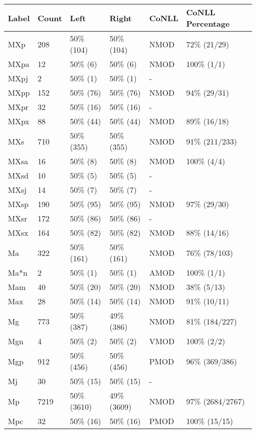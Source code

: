 \begin{figure*}
\begin{tabular}{|l|l|l|l||l|l|}
\hline
Label & Count & Left & Right & CoNLL & CoNLL Percentage\\ 
\hline
 MXp & 208 & 50\% (104) & 50\% (104) & NMOD & 72\% (21/29) \\ 
\hline
 MXpa & 12 & 50\% (6) & 50\% (6) & NMOD & 100\% (1/1) \\ 
\hline
 MXpj & 2 & 50\% (1) & 50\% (1) & - &  \\ 
\hline
 MXpp & 152 & 50\% (76) & 50\% (76) & NMOD & 94\% (29/31) \\ 
\hline
 MXpr & 32 & 50\% (16) & 50\% (16) & - &  \\ 
\hline
 MXpx & 88 & 50\% (44) & 50\% (44) & NMOD & 89\% (16/18) \\ 
\hline
 MXs & 710 & 50\% (355) & 50\% (355) & NMOD & 91\% (211/233) \\ 
\hline
 MXsa & 16 & 50\% (8) & 50\% (8) & NMOD & 100\% (4/4) \\ 
\hline
 MXsd & 10 & 50\% (5) & 50\% (5) & - &  \\ 
\hline
 MXsj & 14 & 50\% (7) & 50\% (7) & - &  \\ 
\hline
 MXsp & 190 & 50\% (95) & 50\% (95) & NMOD & 97\% (29/30) \\ 
\hline
 MXsr & 172 & 50\% (86) & 50\% (86) & - &  \\ 
\hline
 MXsx & 164 & 50\% (82) & 50\% (82) & NMOD & 88\% (14/16) \\ 
\hline
 Ma & 322 & 50\% (161) & 50\% (161) & NMOD & 76\% (78/103) \\ 
\hline
 Ma*n & 2 & 50\% (1) & 50\% (1) & AMOD & 100\% (1/1) \\ 
\hline
 Mam & 40 & 50\% (20) & 50\% (20) & NMOD & 38\% (5/13) \\ 
\hline
 Max & 28 & 50\% (14) & 50\% (14) & NMOD & 91\% (10/11) \\ 
\hline
 Mg & 773 & 50\% (387) & 49\% (386) & NMOD & 81\% (184/227) \\ 
\hline
 Mgn & 4 & 50\% (2) & 50\% (2) & VMOD & 100\% (2/2) \\ 
\hline
 Mgp & 912 & 50\% (456) & 50\% (456) & PMOD & 96\% (369/386) \\ 
\hline
 Mj & 30 & 50\% (15) & 50\% (15) & - &  \\ 
\hline
 Mp & 7219 & 50\% (3610) & 49\% (3609) & NMOD & 97\% (2684/2767) \\ 
\hline
 Mpc & 32 & 50\% (16) & 50\% (16) & PMOD & 100\% (15/15) \\ 

\end{tabular}
\end{figure*}
